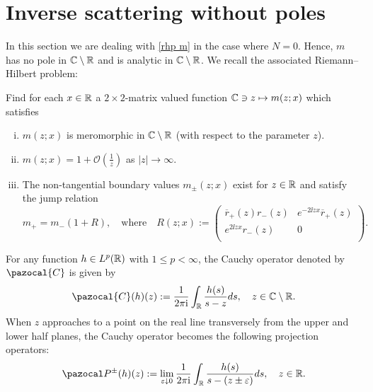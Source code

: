 \section{Inverse scattering without poles}\label{s inverse sc}
In this section we are dealing with \rh \ref{rhp m} in the case where $N=0$. Hence, $m$ has no pole in $\mathbb C\setminus\mathbb R$ and is analytic in $\mathbb C\setminus\mathbb R$. We recall the associated Riemann--Hilbert problem:\\
\begin{framed}
    \begin{rhp}\label{rhp m^0}
        Find for each $x\in\mathbb R$ a $2\times 2$-matrix valued function $\mathbb C\ni z\mapsto m(z;x)$ which satisfies
        \begin{enumerate}[(i)]
          \item $m(z;x)$ is meromorphic in $\mathbb C\setminus\mathbb R$ (with respect to the parameter $z$).
          \item $m(z;x)=1+\mathcal{O}\left(\frac{1}{z}\right)$ as $|z|\to\infty$.
          \item The non-tangential boundary values $m_{\pm}(z;x)$ exist for $z\in\mathbb R$ and satisfy the jump relation
              \begin{equation}\label{e jump m^0}
                  m_+=m_-(1+R),\quad\text{where}\quad
                  R(z;x):=
                  \left(
                    \begin{array}{cc}
                       \overline{r}_+(z)r_-(z) & e^{-2\ii zx}\overline{r}_+(z) \\
                       e^{2\ii zx}r_-(z) & 0 \\
                    \end{array}
                  \right).
              \end{equation}
        \end{enumerate}
    \end{rhp}
\end{framed}
For any function $h\in L^p(\mathbb R)$ with $1\leq p<\infty$, the Cauchy operator denoted by $\pazocal{C}$ is given by
\begin{equation*}
    \pazocal{C}(h)(z):=\frac{1}{2\pi\ii}\int_{\Real} \frac{h(s)}{s-z}ds,\quad z\in\Compl\setminus\Real.
\end{equation*}
When $z$ approaches to a point on the real line transversely from the upper and lower half planes, the Cauchy operator becomes the following projection operators:
\begin{equation*}
    \Ppm(h)(z):=\lim_{\eps\downarrow 0}\frac{1}{2\pi\ii}\int_{\Real} \frac{h(s)}{s-(z\pm\eps)}ds,\quad z\in\Real.
\end{equation*}
